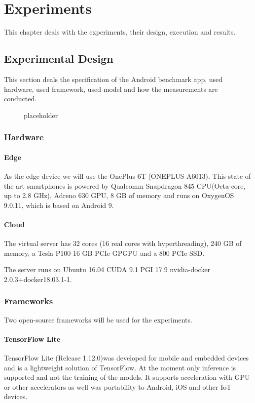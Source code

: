 \chapter{Experiments}
\label{chap:experiments}
This chapter deals with the experiments, their design, execution and results.
\section{Experimental Design}
This section deals the specification of the Android benchmark app, used hardware, used framework, used model and how the measurements are conducted. 
\begin{figure}[H]
\centering

\caption{placeholder}
\label{fig:cloud}
\end{figure}


\subsection{Hardware}
\subsubsection{Edge}
As the edge device we will use the OnePlus 6T (ONEPLUS A6013). This state of the art smartphones is powered by Qualcomm Snapdragon 845 CPU(Octa-core, up to 2.8 GHz), Adreno 630 GPU, 8 GB of memory and runs on OxygenOS 9.0.11, which is based on Android 9.
\subsubsection{Cloud}
The virtual server has 32 cores (16 real cores with hyperthreading), 240 GB of memory, a Tesla P100 16 GB PCIe GPGPU and a 800 PCIe SSD.

The server runs on Ubuntu 16.04 CUDA 9.1 PGI 17.9 nvidia-docker 2.0.3+docker18.03.1-1.
\subsection{Frameworks}
Two open-source frameworks will be used for the experiments.
\subsubsection{TensorFlow Lite}
TensorFlow Lite (Release 1.12.0)was developed for mobile and embedded devices and is a lightweight solution of TensorFlow.
At the moment only inference is supported and not the training of the models.
It supports acceleration with GPU or other accelerators as well was portability to Android, iOS and other IoT devices.


